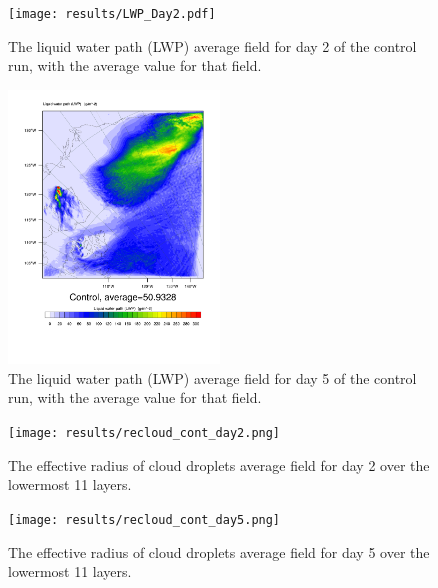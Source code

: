 
\begin{figure}[h]
\centering
\texttt{[image: results/LWP\_Day2.pdf]}
\caption{The liquid water path (LWP) average field for day 2 of the control run, with the average value for that field.}
\label{fig:LWPr1Day2}
\end{figure}

\begin{figure}[h]
\centering
\includegraphics[width=0.5\textwidth]{results/LWP_Day5.pdf}
\caption{The liquid water path (LWP) average field for day 5 of the control run, with the average value for that field.}
\label{fig:LWPr1Day5}
\end{figure}


\begin{figure}[h]
\centering
\texttt{[image: results/recloud\_cont\_day2.png]}
\caption{The effective radius of cloud droplets average field for day 2 over the lowermost 11 layers.}
\label{fig:recloud_r1Day2}
\end{figure}

\begin{figure}[h]
\centering
\texttt{[image: results/recloud\_cont\_day5.png]}
\caption{The effective radius of cloud droplets average field for day 5 over the lowermost 11 layers.}
\label{fig:recloud_r1Day5}
\end{figure}

